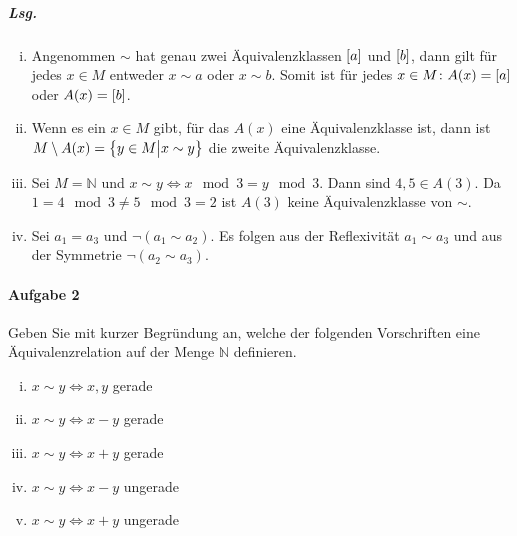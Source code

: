 \documentclass{scrreprt}
\begin{document}
\begin{enumerate}[(a)]
  \subparagraph{Lsg.}
  \begin{enumerate}[(i)]
  \item Angenommen $\sim$ hat genau zwei Äquivalenzklassen $\qty[a]$ und
    $\qty[b]$, dann gilt für jedes $x \in M$ entweder $x \sim a$ oder
    $x \sim b$.
    Somit ist für jedes $x \in M \colon A(x) = \qty[a]$ oder $A(x) = \qty[b]$.

  \item Wenn es ein $x \in M$ gibt, für das $A(x)$ eine Äquivalenzklasse ist,
    dann ist $M \setminus A(x) = \qty{y \in M {\big |} x \sim y}$ die zweite
    Äquivalenzklasse.

  \item Sei $M = \mathbb{N}$ und $x \sim y \iff x \mod 3 = y \mod 3$.
    Dann sind $4, 5 \in A(3)$.
    Da $1 = 4 \mod 3 \ne 5 \mod 3 = 2$ ist $A(3)$ keine Äquivalenzklasse von
    $\sim$.
  \item Sei $a_1 = a_3$ und $\neg (a_1 \sim a_2)$.
    Es folgen aus der Reflexivität $a_1 \sim a_3$ und aus der Symmetrie
    $\neg(a_2 \sim a_3)$.
  \end{enumerate}
\end{enumerate}

\newpage
\paragraph{Aufgabe 2} Geben Sie mit kurzer Begründung an, welche der folgenden
Vorschriften eine Äquivalenzrelation auf der Menge $\mathbb{N}$ definieren.
\begin{enumerate}[(i)]
\item $x \sim y \iff x, y$ gerade
\item $x \sim y \iff x - y$ gerade
\item $x \sim y \iff x + y$ gerade
\item $x \sim y \iff x - y$ ungerade
\item $x \sim y \iff x + y$ ungerade
\end{enumerate}
\end{document}
